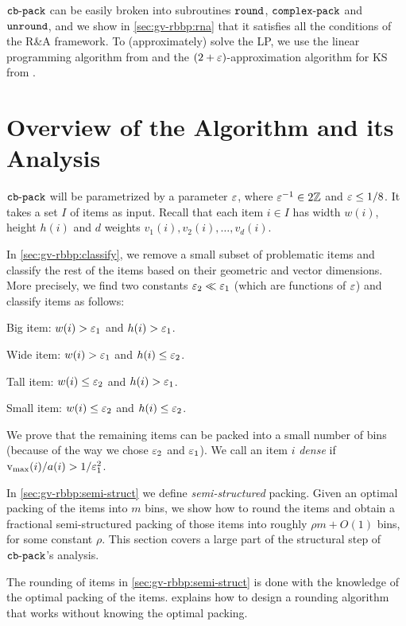 $\operatorname{\mathtt{cb-pack}}$ can be easily broken into subroutines $\operatorname{\mathtt{round}}$, $\operatorname{\mathtt{complex-pack}}$ and $\operatorname{\mathtt{unround}}$,
and we show in \cref{sec:gv-rbbp:rna} that it satisfies all the conditions
of the R\&A framework.
To (approximately) solve the \config{} LP, we use the linear programming algorithm
from \cite{eku-pst} and the $(2+\varepsilon)$-approximation algorithm for
 KS from \cite{aco-gvks}.

\section{Overview of the Algorithm and its Analysis}

$\operatorname{\mathtt{cb-pack}}$ will be parametrized by a parameter $\varepsilon$,
where $\varepsilon^{-1} \in 2\mathbb{Z}$ and $\varepsilon \le 1/8$.
It takes a set $I$ of  items as input.
Recall that each item $i \in I$ has width $w(i)$, height $h(i)$
and $d$ weights $v_1(i), v_2(i), \ldots, v_d(i)$.

In \cref{sec:gv-rbbp:classify}, we remove a small subset of problematic items
and classify the rest of the items based on their geometric and vector dimensions.
More precisely, we find two constants $\varepsilon_2 \ll \varepsilon_1$
(which are functions of $\varepsilon$) and classify items as follows:
\begin{tightemize}
\item Big item: $w(i) > \varepsilon_1$ and $h(i) > \varepsilon_1$.
\item Wide item: $w(i) > \varepsilon_1$ and $h(i) \le \varepsilon_2$.
\item Tall item: $w(i) \le \varepsilon_2$ and $h(i) > \varepsilon_1$.
\item Small item: $w(i) \le \varepsilon_2$ and $h(i) \le \varepsilon_2$.
\end{tightemize}
We prove that the remaining items can be packed into a small number of bins
(because of the way we chose $\varepsilon_2$ and $\varepsilon_1$).
We call an item $i$ \emph{dense} if $\operatorname{v_{\max}}(i)/a(i) > 1/\varepsilon_1^2$.

In \cref{sec:gv-rbbp:semi-struct} we define \emph{semi-structured} packing.
Given an optimal packing of the items into $m$ bins, we show how to
round the items and obtain a fractional semi-structured packing of those items
into roughly $\rho m + O(1)$ bins, for some constant $\rho$.
This section covers a large part of the structural step of $\operatorname{\mathtt{cb-pack}}$'s analysis.

The rounding of items in \cref{sec:gv-rbbp:semi-struct} is done with the knowledge
of the optimal packing of the items.  explains how to
design a rounding algorithm that works without knowing the optimal packing.

